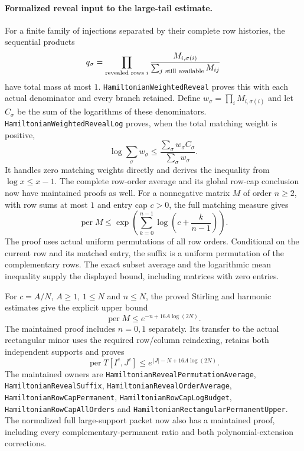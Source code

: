 \paragraph{Formalized reveal input to the large-tail estimate.}
For a finite family of injections separated by their complete row
histories, the sequential products
\[
 q_\sigma=\prod_{\text{revealed rows }i}
 \frac{M_{i,\sigma(i)}}{\sum_{j\ {\rm still\ available}}M_{ij}}
\]
have total mass at most \(1\).
\texttt{HamiltonianWeightedReveal} proves this with each actual
denominator and every branch retained. Define
\(w_\sigma=\prod_i M_{i,\sigma(i)}\) and let \(C_\sigma\)
be the sum of the logarithms of these denominators.
\texttt{HamiltonianWeightedRevealLog} proves, when the total
matching weight is positive,
\[
 \log\sum_\sigma w_\sigma
       \leq\frac{\sum_\sigma w_\sigma C_\sigma}
                      {\sum_\sigma w_\sigma}.
\]
It handles zero matching weights directly and derives the
inequality from \(\log x\leq x-1\).
The complete row-order average and its global row-cap conclusion
now have maintained proofs as well.
For a nonnegative matrix \(M\) of order \(n\geq2\), with row sums
at most \(1\) and entry cap \(c>0\), the full matching measure gives
\[
 \operatorname{per}M\leq
  \exp\!\left(\sum_{k=0}^{n-1}
       \log\left(c+\frac{k}{n-1}\right)\right).
\]
The proof uses actual uniform permutations of all row orders.
Conditional on the current row and its matched entry, the suffix
is a uniform permutation of the complementary rows.
The exact subset average and the logarithmic mean inequality
supply the displayed bound, including matrices with zero entries.

For \(c=A/N\), \(A\geq1\), \(1\leq N\) and \(n\leq N\), the
proved Stirling and harmonic estimates give the explicit upper bound
\[
 \operatorname{per}M\leq e^{-n+16A\log(2N)}.
\]
The maintained proof includes \(n=0,1\) separately.
Its transfer to the actual rectangular minor uses the required
row/column reindexing, retains both independent supports and
proves
\[
 \operatorname{per}T[I^c,J^c]\leq
            e^{\,|J|-N+16A\log(2N)}.
\]
The maintained owners are
\texttt{HamiltonianRevealPermutationAverage},
\texttt{HamiltonianRevealSuffix},
\texttt{HamiltonianRevealOrderAverage},
\texttt{HamiltonianRowCapPermanent},
\texttt{HamiltonianRowCapLogBudget},
\texttt{HamiltonianRowCapAllOrders} and
\texttt{HamiltonianRectangularPermanentUpper}.
The normalized full large-support packet now also has a maintained
proof, including every complementary-permanent ratio and both
polynomial-extension corrections.

